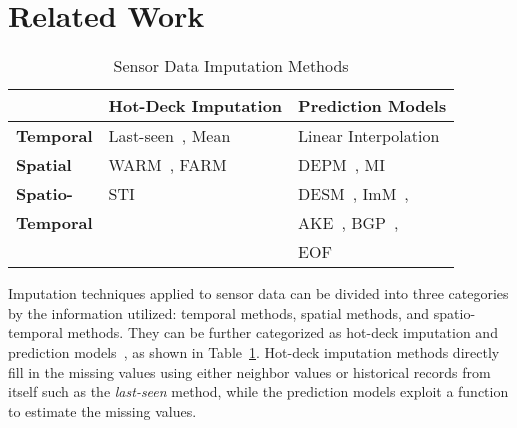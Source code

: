 \section{Related Work}\label{sec:rw}


\begin{table}[h]
\setlength{\tabcolsep}{2pt}
\vspace{-0.2cm}
\caption{Sensor Data Imputation Methods}
\label{tbl:methods}
\centering
{\small
\begin{tabular}{|l|l|l|} \hline
   &{\bf Hot-Deck Imputation}&{\bf Prediction Models}\\ \hline
{\bf Temporal} & Last-seen~\cite{Granger:lastseen}, Mean & Linear Interpolation\\ \hline
{\bf Spatial} & WARM~\cite{le2005estimating}, FARM~\cite{Gruenwald:FARM} & DEPM~\cite{li2008data}, MI~\cite{yuan2000multiple}\\\hline
{\bf Spatio-} & STI~\cite{Jian-Zhong:STI} & DESM~\cite{li2008data}, ImM~\cite{Lim:robust},\\
{\bf Temporal} &&AKE~\cite{pan2010k}, BGP~\cite{osborne2012real},\\
{ } && EOF~\cite{beckers2003eof, kondrashov2006spatio}\\
 \hline \end{tabular}
}
\vspace{-0.1in}
\end{table}

Imputation techniques applied to sensor data can be divided into three categories by the information utilized:
temporal methods, spatial methods, 
and spatio-temporal methods. They can be further categorized as hot-deck imputation and prediction models~\cite{Garcia:KNNreview},
as shown in Table~\ref{tbl:methods}.
Hot-deck imputation methods directly fill in the missing values using either neighbor values or historical records from itself 
such as the \textit{last-seen} method, while the prediction models exploit a function 
to estimate the missing values. 


